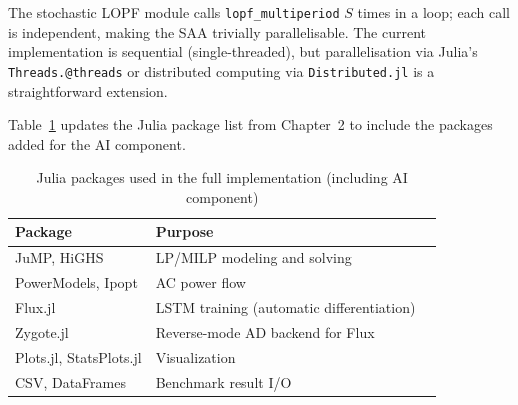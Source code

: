 The stochastic LOPF module calls \texttt{lopf\_multiperiod} $S$ times in a loop; each call is independent, making the SAA trivially parallelisable. The current implementation is sequential (single-threaded), but parallelisation via Julia's \texttt{Threads.@threads} or distributed computing via \texttt{Distributed.jl} is a straightforward extension.

Table~\ref{tab:julia_packages_full} updates the Julia package list from Chapter~2 to include the packages added for the AI component.

\begin{table}[H]
\centering
\caption{Julia packages used in the full implementation (including AI component)}
\label{tab:julia_packages_full}
\begin{tabular}{lll}
\toprule
\textbf{Package} & \textbf{Purpose} \\
\midrule
JuMP, HiGHS   & LP/MILP modeling and solving \\
PowerModels, Ipopt & AC power flow \\
Flux.jl       & LSTM training (automatic differentiation) \\
Zygote.jl     & Reverse-mode AD backend for Flux \\
Plots.jl, StatsPlots.jl & Visualization \\
CSV, DataFrames & Benchmark result I/O \\
\bottomrule
\end{tabular}
\end{table}
